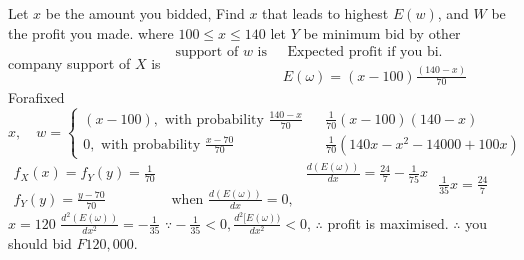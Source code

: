 Let $x$ be the amount you bidded, Find $x$ that leads to highest $E(w)$, and $W$ be the profit you made.
where $100 \leqslant x \leqslant 140$
let $Y$ be minimum bid by other company
support of $X$ is
$\begin{array}{ll}\text { support of } w \text { is } & \text { Expected profit if you bi. } \\ & E(\omega)=(x-100) \frac{(140-x)}{70}\end{array}$
Forafixed $x, \quad w=\left\{\begin{aligned}(x-100), \text { with probability } \frac{140-x}{70} & & \frac{1}{70}(x-100)(140-x) \\ 0, \text { with probability } \frac{x-70}{70} & & \frac{1}{70}\left(140 x-x^2-14000+100 x\right) \end{aligned}\right.$
$\begin{aligned} f_X(x)=f_Y(y)=\frac{1}{70} & & \frac{d(E(\omega))}{d x}=\frac{24}{7}-\frac{1}{75} x \\ f_Y(y)=\frac{y-70}{70} & \text { when } \frac{d(E(\omega))}{d x}=0, \end{aligned}$
$\frac{1}{35} x=\frac{24}{7}$
$x=120$
$\frac{d^2(E(\omega))}{d x^2}=-\frac{1}{35}$
$\because-\frac{1}{35}<0, \frac{d^2[E(\omega))}{d x^2}<0$,
$\therefore$ profit is maximised.
$\therefore$ you should bid $F 120,000$.